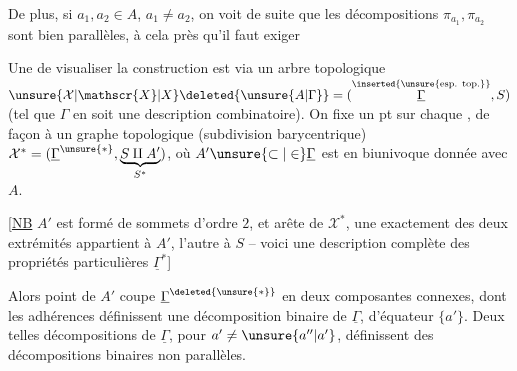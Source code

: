 De plus, si $a_1,a_2\in A$, $a_1\ne a_2$, on voit de suite que les décompositions $\pi_{a_1},\pi_{a_2}$ sont bien parallèles, à cela près qu'il faut exiger %

Une  de visualiser la construction est via un arbre topologique $\unsure{\mathcal{X}|\mathscr{X}|X}\deleted{\unsure{A|\Gamma}}=(\overset{\text{\inserted{\unsure{esp. top.}}}}{\underline{\Gamma}},S)$ (tel que $\Gamma$ en soit une description combinatoire). On fixe un pt sur
chaque , de façon à  un graphe topologique (subdivision barycentrique) $\mathcal{X}^{\ast}=(\underline{\Gamma}^{\unsure{\ast}},\underbrace{S\amalg A'}_{S^{\ast}})$, où $A'\unsure{\subset|\in}\underline{\Gamma}$ est en  biunivoque donnée avec  $A$.

 [\uline{NB} $A'$ est formé de  sommets d'ordre $2$, et   arête de $\mathcal{X}^{\ast}$, une exactement des deux extrémités appartient à $A'$, l'autre à $S$ -- voici une description complète des propriétés particulières  $\underline{\Gamma}^{\ast}$]

Alors  point  de $A'$ coupe $\underline{\Gamma}^{\deleted{\unsure{\ast}}}$ en deux composantes connexes, dont les adhérences définissent une décomposition binaire de $\underline{\Gamma}$, d'équateur $\{a'\}$. Deux
telles décompositions  de $\underline{\Gamma}$, pour $a'\ne\unsure{a''|a'}$, définissent des décompositions binaires  non parallèles.
